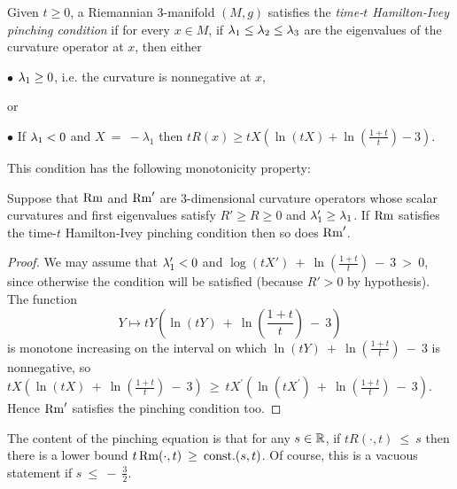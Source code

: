 \begin{definition}
  \label{def:kl-almost-nonnegative-curvature-positivity-curvature-operators}
 \label{HamIvey}
Given $t\geq 0$, a Riemannian $3$-manifold $(M,g)$ satisfies the
{\em  time-$t$ Hamilton-Ivey pinching condition} if for every $x\in M$,
if $\lambda_1\leq \lambda_2\leq \lambda_3$ are the eigenvalues of the curvature operator at $x$,
then either

$\bullet$ $\lambda_1\geq 0$, i.e. the curvature is nonnegative at $x$,

or

$\bullet$ If $\lambda_1 < 0$ and $X \: = \: - \lambda_1$ then
$tR(x)\geq tX \left(\ln (tX) + \ln \left( \frac{1+t}{t} \right)-3
\right)$.
\end{definition}
This condition has the following monotonicity property:

\begin{lemma}
  \label{lem:kl-almost-nonnegative-curvature-monotonicity-scalar-curvature}

\label{lempinchingmonotonic}
Suppose that $\operatorname{Rm}$ and $\operatorname{Rm}'$
are $3$-dimensional  curvature operators whose scalar curvatures
and first eigenvalues satisfy
$R'\geq R\geq 0$ and $\lambda_1'\geq \lambda_1$.
If $\operatorname{Rm}$ satisfies the time-$t$ Hamilton-Ivey pinching condition then so does
$\operatorname{Rm}'$.
\end{lemma}
\begin{proof}
We may assume that  $\lambda_1'<0$ and
$\log (tX') \: + \: \ln \left( \frac{1+t}{t} \right) \: - \: 3 \: > \: 0$,
since otherwise the condition will be satisfied
(because $R'>0$ by hypothesis).  The function
\begin{equation}
Y\mapsto tY \left( \ln(t Y) \: + \: \ln \left( \frac{1+t}{t} \right) \: - \: 3 \right)
\end{equation}
is monotone increasing on the interval on which
$\ln(t Y) \: + \: \ln \left( \frac{1+t}{t} \right) \: - \: 3$
is nonnegative, so
$tX \left( \ln(t X) \: + \: \ln \left( \frac{1+t}{t} \right) \: - \: 3 \right)
\: \ge \:
tX^\prime \left( \ln(t X^\prime) \: + \: \ln \left( \frac{1+t}{t} \right) \: - \: 3 \right)$.
Hence $\operatorname{Rm}'$ satisfies the pinching condition too.
\end{proof}


The content of the pinching equation is that for any $s \in {\mathbb R}$,
if $t R(\cdot, t) \: \le \:
s$ then there is a lower bound $t \operatorname{Rm} (\cdot, t) \: \ge \: \operatorname{const.}
(s, t)$. Of course, this is a vacuous statement
if $s \: \le \: - \: \frac{3}{2}$.

